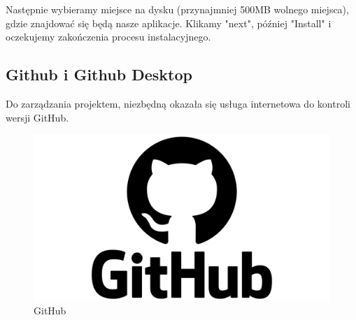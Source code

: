 Następnie wybieramy miejsce na dysku (przynajmniej 500MB wolnego miejsca), gdzie znajdować się będą nasze aplikacje. Klikamy "next", później "Install" i oczekujemy zakończenia procesu instalacyjnego.

\subsection{Github i Github Desktop}
\hspace{0.60 cm}Do zarządzania projektem, niezbędną okazała się usługa internetowa do kontroli wersji GitHub.
\begin{figure}[!hbt]
	\begin{center}
		\includegraphics[width=\textwidth]{rys/Github.png}
		\caption{GitHub}
		\label{rys:Github-icon}
	\end{center}
\end{figure}

